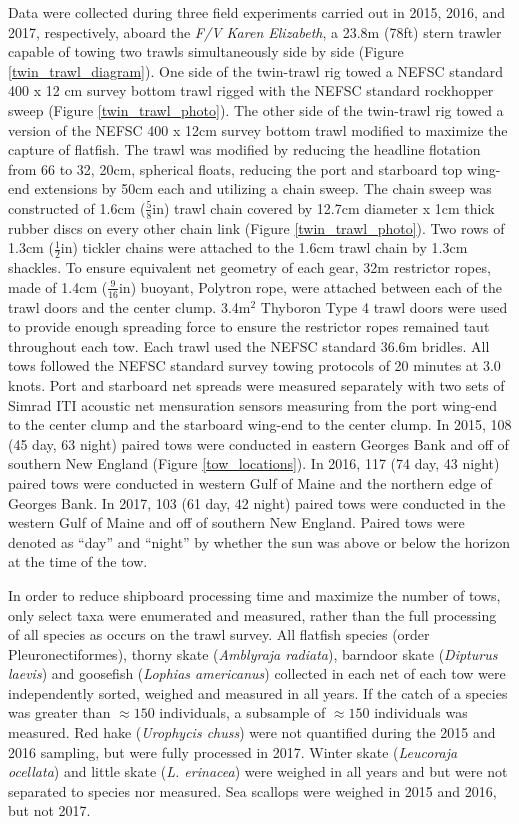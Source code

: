 \documentclass[
  12pt,
]{article}
\begin{document}
Data were collected during three field experiments carried out in 2015,
2016, and 2017, respectively, aboard the \emph{F/V Karen Elizabeth}, a
23.8m (78ft) stern trawler capable of towing two trawls simultaneously
side by side (Figure \ref{twin_trawl_diagram}). One side of the
twin-trawl rig towed a NEFSC standard 400 x 12 cm survey bottom trawl
rigged with the NEFSC standard rockhopper sweep \citep{politisetal14}
(Figure \ref{twin_trawl_photo}). The other side of the twin-trawl rig
towed a version of the NEFSC 400 x 12cm survey bottom trawl modified to
maximize the capture of flatfish. The trawl was modified by reducing the
headline flotation from 66 to 32, 20cm, spherical floats, reducing the
port and starboard top wing-end extensions by 50cm each and utilizing a
chain sweep. The chain sweep was constructed of 1.6cm
(\(\frac{5}{8}\)in) trawl chain covered by 12.7cm diameter x 1cm thick
rubber discs on every other chain link (Figure \ref{twin_trawl_photo}).
Two rows of 1.3cm (\(\frac{1}{2}\)in) tickler chains were attached to
the 1.6cm trawl chain by 1.3cm shackles. To ensure equivalent net
geometry of each gear, 32m restrictor ropes, made of 1.4cm
(\(\frac{9}{16}\)in) buoyant, Polytron rope, were attached between each
of the trawl doors and the center clump. 3.4m\(^2\) Thyboron Type 4
trawl doors were used to provide enough spreading force to ensure the
restrictor ropes remained taut throughout each tow. Each trawl used the
NEFSC standard 36.6m bridles. All tows followed the NEFSC standard
survey towing protocols of 20 minutes at 3.0 knots. Port and starboard
net spreads were measured separately with two sets of Simrad ITI
acoustic net mensuration sensors measuring from the port wing-end to the
center clump and the starboard wing-end to the center clump. In 2015,
108 (45 day, 63 night) paired tows were conducted in eastern Georges
Bank and off of southern New England (Figure \ref{tow_locations}). In
2016, 117 (74 day, 43 night) paired tows were conducted in western Gulf
of Maine and the northern edge of Georges Bank. In 2017, 103 (61 day, 42
night) paired tows were conducted in the western Gulf of Maine and off
of southern New England. Paired tows were denoted as ``day'' and
``night'' by whether the sun was above or below the horizon at the time
of the tow.

In order to reduce shipboard processing time and maximize the number of
tows, only select taxa were enumerated and measured, rather than the
full processing of all species as occurs on the trawl survey. All
flatfish species (order Pleuronectiformes), thorny skate
(\emph{Amblyraja radiata}), barndoor skate (\emph{Dipturus laevis}) and
goosefish (\emph{Lophias americanus}) collected in each net of each tow
were independently sorted, weighed and measured in all years. If the
catch of a species was greater than \({\approx}150\) individuals, a
subsample of \({\approx}150\) individuals was measured. Red hake
(\emph{Urophycis chuss}) were not quantified during the 2015 and 2016
sampling, but were fully processed in 2017. Winter skate
(\emph{Leucoraja ocellata}) and little skate (\emph{L. erinacea}) were
weighed in all years and but were not separated to species nor measured.
Sea scallops were weighed in 2015 and 2016, but not 2017.
\end{document}
